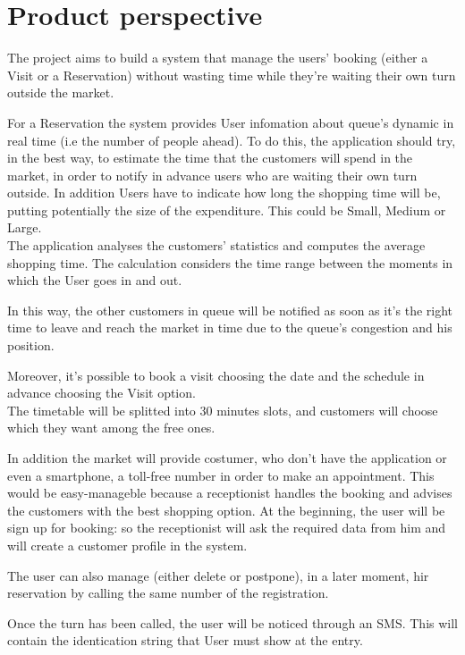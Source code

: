 \section{Product perspective}

The project aims to build a system that manage the users’ booking (either a Visit or a Reservation) without wasting time while they're waiting their own turn outside the market. 
\par
For a Reservation the system provides User infomation about queue's dynamic in real time (i.e the number of people ahead). 
To do this, the application should try, in the best way, to estimate the time that the customers will spend in the market, in order to notify in advance users who are waiting their own turn outside. 
In addition Users have to indicate how long the shopping time will be, putting potentially the size of the expenditure. This could be Small, Medium or Large.
\\
The application analyses the customers’ statistics and computes the average shopping time.
The calculation considers the time range between the moments in which the User goes in and out.  
\par
In this way, the other customers in queue will be notified as soon as it's the right time to leave and reach the market in time due to the queue's congestion and his position.  

\par
Moreover, it's possible to book a visit choosing the date and the schedule in advance choosing the Visit option. 
\\
The timetable will be splitted into 30 minutes slots, and customers will choose which they want among the free ones. \par

In addition the market will provide costumer, who don't have the application or even a smartphone, a toll-free number in order to make an appointment.
This would be easy-manageble because a receptionist handles the booking and advises the customers with the best shopping option. %
At the beginning, the user will be sign up for booking: so the receptionist will ask the required data from him and will create a customer profile in the system.

The user can also manage (either delete or postpone), in a later moment, hir reservation by calling the same number of the registration.


Once the turn has been called, the user will be noticed through an SMS.
This will contain the identication string that User must show at the entry.

